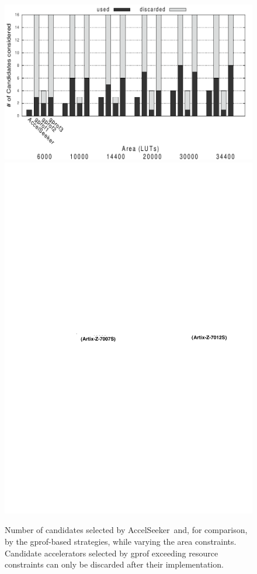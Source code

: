 \documentclass[]{usiinfthesis}
\newcommand{\aseeker}{{AccelSeeker}}
\begin{document}
\begin{figure}[t]
  \centering
  \includegraphics[width=0.8\linewidth]{figs/h264_effort.pdf}
      \centering
  \includegraphics[width=0.8\linewidth]{figs/area_size.pdf}
  \caption{Number of candidates selected by \aseeker\ and, for comparison, by the gprof-based
  strategies, while varying the area constraints. Candidate accelerators
  selected by gprof exceeding resource constraints can only be discarded after their implementation. }
          \label{fig:effort}
\end{figure}
\end{document}
